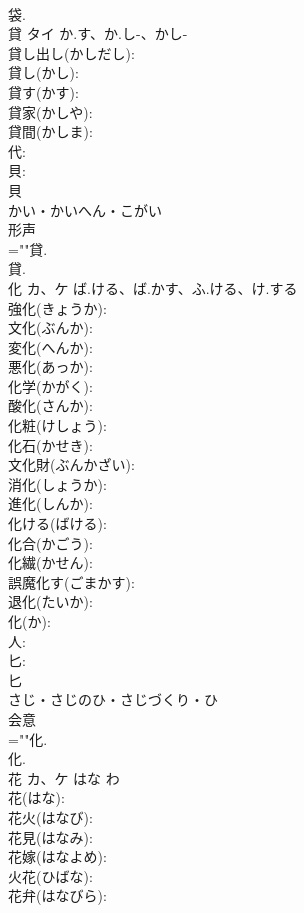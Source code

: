 \documentclass[8pt]{extreport}
\begin{document}
\begin{CJK}{UTF8}{min}
\\	袋.
\\	貸	タイ	か.す、か.し-、かし-		
\\	貸し出し(かしだし): 
\\	貸し(かし): 
\\	貸す(かす): 
\\	貸家(かしや): 
\\	貸間(かしま): 
\\	代: 
\\	貝: 
\\	貝	
\\	かい・かいへん・こがい	
\\	形声 
\\	=""貸.
\\	貸.
\\	化	カ、ケ	ば.ける、ば.かす、ふ.ける、け.する		
\\	強化(きょうか): 
\\	文化(ぶんか): 
\\	変化(へんか): 
\\	悪化(あっか): 
\\	化学(かがく): 
\\	酸化(さんか): 
\\	化粧(けしょう): 
\\	化石(かせき): 
\\	文化財(ぶんかざい): 
\\	消化(しょうか): 
\\	進化(しんか): 
\\	化ける(ばける): 
\\	化合(かごう): 
\\	化繊(かせん): 
\\	誤魔化す(ごまかす): 
\\	退化(たいか): 
\\	化(か): 
\\	人: 
\\	匕: 
\\	匕	
\\	さじ・さじのひ・さじづくり・ひ	
\\	会意 
\\	=""化.
\\	化.
\\	花	カ、ケ	はな	わ	
\\	花(はな): 
\\	花火(はなび): 
\\	花見(はなみ): 
\\	花嫁(はなよめ): 
\\	火花(ひばな): 
\\	花弁(はなびら): 

\end{CJK}
\end{document}
